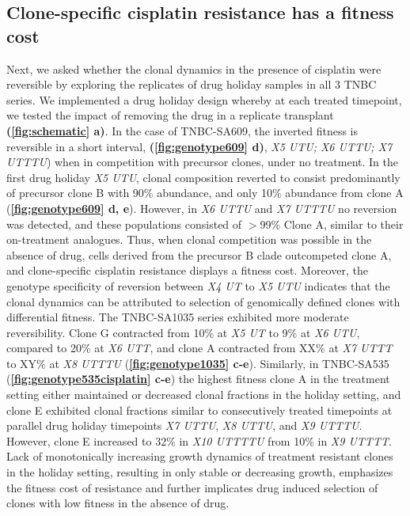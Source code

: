 \subsection {Clone-specific cisplatin resistance has a fitness cost}
Next, we asked whether the clonal dynamics in the presence of cisplatin were reversible by exploring the replicates of drug holiday samples in
 all 3 TNBC series. We implemented a drug holiday design whereby at each treated timepoint, we tested the impact of removing the drug in a replicate transplant \textbf{(\autoref{fig:schematic} a)}. In the case of TNBC-SA609, the inverted fitness is reversible in a short interval, \textbf{(\autoref{fig:genotype609} d)}, \textit{X5 UTU; X6 UTTU; X7 UTTTU}) when in competition with precursor clones, under no treatment. In the first drug holiday \textit{X5 UTU}, clonal composition reverted to consist predominantly of precursor clone B with 90\% abundance, and only 10\% abundance from clone A (\textbf{\autoref{fig:genotype609} d, e}). However, in \textit{X6  UTTU} and \textit{X7 UTTTU} no reversion was detected, and these populations consisted of $>$99\% Clone A, similar to their on-treatment analogues. Thus, when clonal competition was possible in the absence of drug, cells derived from the precursor B clade outcompeted clone A, and clone-specific cisplatin resistance displays a fitness cost. Moreover, the genotype specificity of reversion between \textit{X4 UT} to \textit{X5 UTU} indicates that the clonal dynamics can be attributed to selection of genomically defined clones with differential fitness. The TNBC-SA1035 series exhibited more moderate reversibility. Clone G contracted from 10\% at \textit{X5 UT} to 9\% at \textit{X6 UTU}, compared to 20\% at \textit{X6 UTT}, and clone A contracted from XX\% at \textit{X7 UTTT} to XY\% at \textit{X8 UTTTU} (\textbf{\autoref{fig:genotype1035} c-e}). 
Similarly, in TNBC-SA535 (\textbf{\autoref{fig:genotype535cisplatin} c-e}) the highest fitness clone A in the treatment setting either maintained or decreased clonal fractions in the holiday setting, and clone E exhibited clonal fractions similar to consecutively treated timepoints at parallel drug holiday timepoints \textit{X7 UTTU}, \textit{X8 UTTU}, and \textit{X9 UTTTU}.  However, clone E increased to 32\% in \textit{X10 UTTTTU} from 10\% in \textit{X9 UTTTT}.  Lack of monotonically increasing growth dynamics of treatment resistant clones in the holiday setting, resulting in only stable or decreasing growth, emphasizes the fitness cost of resistance and further implicates drug induced selection of clones with low fitness in the absence of drug.     



